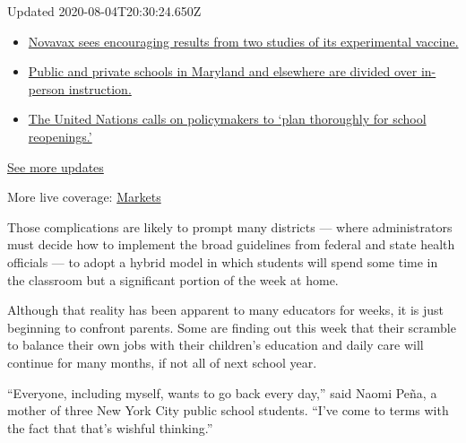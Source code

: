 Updated 2020-08-04T20:30:24.650Z

\begin{itemize}
\tightlist
\item
  \href{https://www.nytimes.com/2020/08/04/world/coronavirus-cases.html?action=click\&pgtype=Article\&state=default\&region=MAIN_CONTENT_1\&context=storylines_live_updates\#link-1228a480}{Novavax
  sees encouraging results from two studies of its experimental
  vaccine.}
\item
  \href{https://www.nytimes.com/2020/08/04/world/coronavirus-cases.html?action=click\&pgtype=Article\&state=default\&region=MAIN_CONTENT_1\&context=storylines_live_updates\#link-4825b93}{Public
  and private schools in Maryland and elsewhere are divided over
  in-person instruction.}
\item
  \href{https://www.nytimes.com/2020/08/04/world/coronavirus-cases.html?action=click\&pgtype=Article\&state=default\&region=MAIN_CONTENT_1\&context=storylines_live_updates\#link-50f7386d}{The
  United Nations calls on policymakers to `plan thoroughly for school
  reopenings.'}
\end{itemize}

\href{https://www.nytimes.com/2020/08/04/world/coronavirus-cases.html?action=click\&pgtype=Article\&state=default\&region=MAIN_CONTENT_1\&context=storylines_live_updates}{See
more updates}

More live coverage:
\href{https://www.nytimes.com/live/2020/08/04/business/stock-market-today-coronavirus?action=click\&pgtype=Article\&state=default\&region=MAIN_CONTENT_1\&context=storylines_live_updates}{Markets}

Those complications are likely to prompt many districts --- where
administrators must decide how to implement the broad guidelines from
federal and state health officials --- to adopt a hybrid model in which
students will spend some time in the classroom but a significant portion
of the week at home.

Although that reality has been apparent to many educators for weeks, it
is just beginning to confront parents. Some are finding out this week
that their scramble to balance their own jobs with their children's
education and daily care will continue for many months, if not all of
next school year.

``Everyone, including myself, wants to go back every day,'' said Naomi
Peña, a mother of three New York City public school students. ``I've
come to terms with the fact that that's wishful thinking.''

